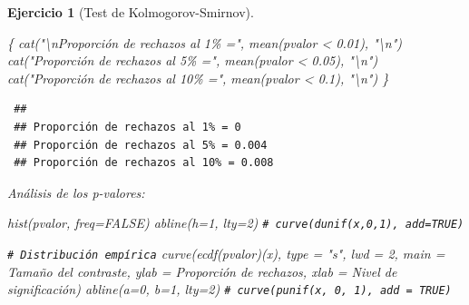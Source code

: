 \documentclass[
]{book}
\newenvironment{Shaded}{\begin{snugshade}}{\end{snugshade}}
\newcommand{\AttributeTok}[1]{\textcolor[rgb]{0.77,0.63,0.00}{#1}}
\newcommand{\CommentTok}[1]{\textcolor[rgb]{0.56,0.35,0.01}{\textit{#1}}}
\newcommand{\ConstantTok}[1]{\textcolor[rgb]{0.00,0.00,0.00}{#1}}
\newcommand{\DecValTok}[1]{\textcolor[rgb]{0.00,0.00,0.81}{#1}}
\newcommand{\FloatTok}[1]{\textcolor[rgb]{0.00,0.00,0.81}{#1}}
\newcommand{\FunctionTok}[1]{\textcolor[rgb]{0.00,0.00,0.00}{#1}}
\newcommand{\NormalTok}[1]{#1}
\newcommand{\SpecialCharTok}[1]{\textcolor[rgb]{0.00,0.00,0.00}{#1}}
\newcommand{\StringTok}[1]{\textcolor[rgb]{0.31,0.60,0.02}{#1}}
\theoremstyle{break}
\newtheorem{exercise}{Ejercicio}[chapter]
\theoremstyle{nonumberplain}
\renewcommand{\CommentTok}[1]{\textcolor[rgb]{0.41,0.41,0.41}{\texttt{#1}}}
\begin{document}
\begin{exercise}[Test de Kolmogorov-Smirnov]
\begin{enumerate}
\begin{Shaded}
\begin{Highlighting}[]
\NormalTok{\{}
  \FunctionTok{cat}\NormalTok{(}\StringTok{"}\SpecialCharTok{\textbackslash{}n}\StringTok{Proporción de rechazos al 1\% ="}\NormalTok{, }\FunctionTok{mean}\NormalTok{(pvalor }\SpecialCharTok{\textless{}} \FloatTok{0.01}\NormalTok{), }\StringTok{"}\SpecialCharTok{\textbackslash{}n}\StringTok{"}\NormalTok{)}
  \FunctionTok{cat}\NormalTok{(}\StringTok{"Proporción de rechazos al 5\% ="}\NormalTok{, }\FunctionTok{mean}\NormalTok{(pvalor }\SpecialCharTok{\textless{}} \FloatTok{0.05}\NormalTok{), }\StringTok{"}\SpecialCharTok{\textbackslash{}n}\StringTok{"}\NormalTok{)}
  \FunctionTok{cat}\NormalTok{(}\StringTok{"Proporción de rechazos al 10\% ="}\NormalTok{, }\FunctionTok{mean}\NormalTok{(pvalor }\SpecialCharTok{\textless{}} \FloatTok{0.1}\NormalTok{), }\StringTok{"}\SpecialCharTok{\textbackslash{}n}\StringTok{"}\NormalTok{)}
\NormalTok{\}}
\end{Highlighting}
\end{Shaded}

\begin{verbatim}
 ## 
 ## Proporción de rechazos al 1% = 0 
 ## Proporción de rechazos al 5% = 0.004 
 ## Proporción de rechazos al 10% = 0.008
\end{verbatim}

  Análisis de los p-valores:

\begin{Shaded}
\begin{Highlighting}[]
\FunctionTok{hist}\NormalTok{(pvalor, }\AttributeTok{freq=}\ConstantTok{FALSE}\NormalTok{)}
\FunctionTok{abline}\NormalTok{(}\AttributeTok{h=}\DecValTok{1}\NormalTok{, }\AttributeTok{lty=}\DecValTok{2}\NormalTok{)   }\CommentTok{\# curve(dunif(x,0,1), add=TRUE)}

\CommentTok{\# Distribución empírica}
\FunctionTok{curve}\NormalTok{(}\FunctionTok{ecdf}\NormalTok{(pvalor)(x), }\AttributeTok{type =} \StringTok{"s"}\NormalTok{, }\AttributeTok{lwd =} \DecValTok{2}\NormalTok{, }
      \AttributeTok{main =} \StringTok{\textquotesingle{}Tamaño del contraste\textquotesingle{}}\NormalTok{, }\AttributeTok{ylab =} \StringTok{\textquotesingle{}Proporción de rechazos\textquotesingle{}}\NormalTok{, }
      \AttributeTok{xlab =} \StringTok{\textquotesingle{}Nivel de significación\textquotesingle{}}\NormalTok{)}
\FunctionTok{abline}\NormalTok{(}\AttributeTok{a=}\DecValTok{0}\NormalTok{, }\AttributeTok{b=}\DecValTok{1}\NormalTok{, }\AttributeTok{lty=}\DecValTok{2}\NormalTok{)   }\CommentTok{\# curve(punif(x, 0, 1), add = TRUE) }
\end{Highlighting}
\end{Shaded}


\end{enumerate}
\end{exercise}
\end{document}
